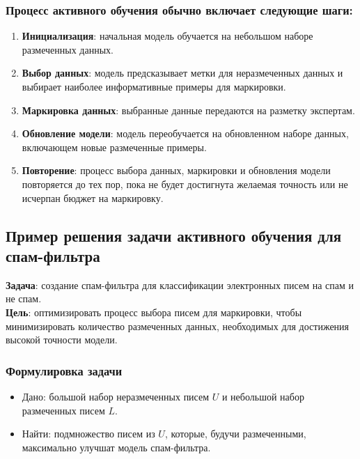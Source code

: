 \documentclass{article}
\begin{document}
\subsubsection*{Процесс активного обучения обычно включает следующие шаги:}
\begin{enumerate}
    \item \textbf{Инициализация}: начальная модель обучается на небольшом наборе размеченных данных.
    \item \textbf{Выбор данных}: модель предсказывает метки для неразмеченных данных и выбирает наиболее информативные примеры для маркировки.
    \item \textbf{Маркировка данных}: выбранные данные передаются на разметку экспертам.
    \item \textbf{Обновление модели}: модель переобучается на обновленном наборе данных, включающем новые размеченные примеры.
    \item \textbf{Повторение}: процесс выбора данных, маркировки и обновления модели повторяется до тех пор, пока не будет достигнута желаемая точность или не исчерпан бюджет на маркировку.
\end{enumerate}

\subsection*{Пример решения задачи активного обучения для спам-фильтра}

\noindent \textbf{Задача}: создание спам-фильтра для классификации электронных писем на спам и не спам.\\

\noindent \textbf{Цель}: оптимизировать процесс выбора писем для маркировки, чтобы минимизировать количество размеченных данных, необходимых для достижения высокой точности модели.

\subsubsection*{Формулировка задачи}

\begin{itemize}
    \item Дано: большой набор неразмеченных писем \(U\) и небольшой набор размеченных писем \(L\).
    \item Найти: подмножество писем из \(U\), которые, будучи размеченными, максимально улучшат модель спам-фильтра.
\end{itemize}
\end{document}
